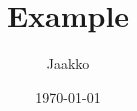 \documentclass[vscode-dark-modern]{perej1-manuscript}
\title{Example}
\author{Jaakko}
\date{\today}
\begin{document}
\maketitle

\blindtext
\end{document}

